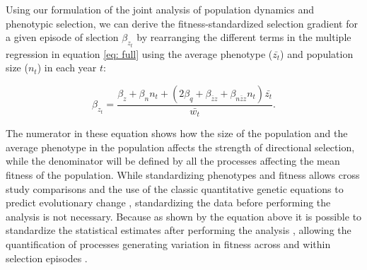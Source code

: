 \documentclass{article}
\begin{document}
Using our formulation of the joint analysis of population dynamics and phenotypic selection, we can derive the fitness-standardized selection gradient for a given episode of slection $\beta_{z_{t}}$ by rearranging the different terms in the multiple regression in equation \ref{eq: full} using the average phenotype ($\bar{z_t}$) and population size ($n_t$) in each year $t$:

\begin{equation}
\beta_{z_{t}}=\frac{\beta_{z} +  \beta_{n}n_t + (2\beta_{q}+ \beta_{\bar{z}z} +  \beta_{n\bar{z}z}n_t)\bar{z_t}}{\bar{w_{t}}} .
\end{equation}

\noindent The numerator in these equation shows how the size of the population and the average phenotype in the population affects the strength of directional selection, while the denominator will be defined by all the processes affecting the mean fitness of the population. While standardizing phenotypes and fitness allows cross study comparisons and the use of the classic quantitative genetic equations to predict evolutionary change \citep{Lande1983}, standardizing the data before performing the analysis is not necessary. Because as shown by the equation above it is possible to standardize the statistical estimates after performing the analysis \citep{Dingemanse2021}, allowing the quantification of processes generating variation in fitness across and within selection episodes .  
\bigskip
\end{document}
